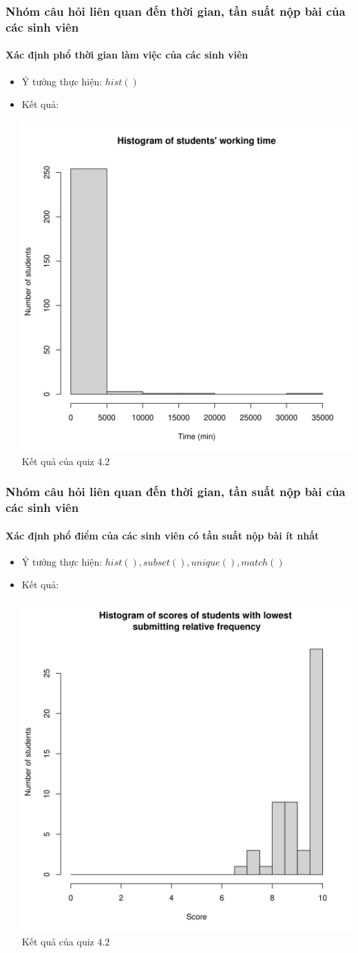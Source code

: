 \documentclass[english,10pt,table]{beamer}
\begin{document}
\frame
{
\frametitle{Nhóm câu hỏi liên quan đến thời gian, tần suất nộp bài của các sinh viên}
\framesubtitle{Xác định phổ thời gian làm việc của các sinh viên}
\begin{itemize}
    \item Ý tưởng thực hiện: $hist()$
    \item Kết quả:\\
    \begin{center}
        \includegraphics[width = 6 cm]{Images/img4-1-4.png}\\
        Kết quả của quiz 4.2
    \end{center}
\end{itemize}
}

\frame
{
\frametitle{Nhóm câu hỏi liên quan đến thời gian, tần suất nộp bài của các sinh viên}
\framesubtitle{Xác định phổ điểm của các sinh viên có tần suất nộp bài ít nhất}
\begin{itemize}
    \item Ý tưởng thực hiện: $hist(), subset(), unique(), match()$
    \item Kết quả:\\
    \begin{center}
        \includegraphics[width = 6 cm]{Images/img4-2-4.png}\\
        Kết quả của quiz 4.2
    \end{center}
\end{itemize}
}
\end{document}
